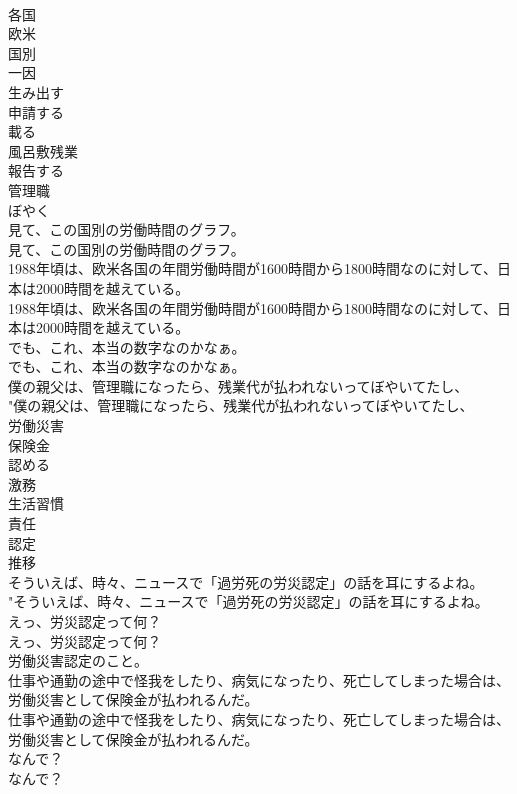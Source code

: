 \documentclass[8pt]{extreport}
\begin{document}
\begin{CJK}{UTF8}{min}
\\	各国
\\	欧米
\\	国別
\\	一因
\\	生み出す
\\	申請する
\\	載る
\\	風呂敷残業
\\	報告する
\\	管理職
\\	ぼやく
\\	見て、この国別の労働時間のグラフ。	
\\	見て、この国別の労働時間のグラフ。 
\\	1988年頃は、欧米各国の年間労働時間が1600時間から1800時間なのに対して、日本は2000時間を越えている。	
\\	1988年頃は、欧米各国の年間労働時間が1600時間から1800時間なのに対して、日本は2000時間を越えている。 
\\	でも、これ、本当の数字なのかなぁ。	
\\	でも、これ、本当の数字なのかなぁ。 
\\	僕の親父は、管理職になったら、残業代が払われないってぼやいてたし、	
\\	"僕の親父は、管理職になったら、残業代が払われないってぼやいてたし、 
\\	労働災害
\\	保険金
\\	認める
\\	激務
\\	生活習慣
\\	責任
\\	認定
\\	推移
\\	そういえば、時々、ニュースで「過労死の労災認定」の話を耳にするよね。	
\\	"そういえば、時々、ニュースで「過労死の労災認定」の話を耳にするよね。 
\\	えっ、労災認定って何？	
\\	えっ、労災認定って何？ 
\\	労働災害認定のこと。	
\\	仕事や通勤の途中で怪我をしたり、病気になったり、死亡してしまった場合は、労働災害として保険金が払われるんだ。	
\\	仕事や通勤の途中で怪我をしたり、病気になったり、死亡してしまった場合は、労働災害として保険金が払われるんだ。 
\\	なんで？	
\\	なんで？ 

\end{CJK}
\end{document}
